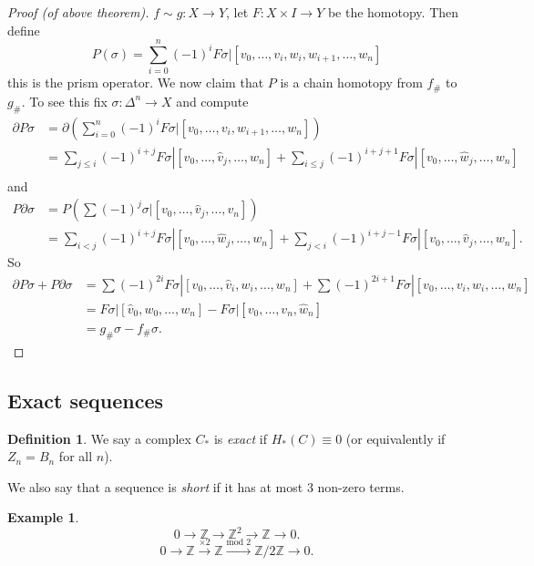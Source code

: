\documentclass[12pt]{article}
\theoremstyle{definition}
\theoremstyle{definition}
\newtheorem*{defn}{Definition}
\newtheorem*{ex}{Example}
\newcommand{\ZZ}{\mathbb{Z}}
\newcommand{\C}{C_*}
\renewcommand{\H}{H_*}
\begin{document}
\begin{proof}[Proof (of above theorem)]
$f\sim g\colon X \to Y$, let $F\colon X \times I \to Y$ be the homotopy.
Then define
\[
P(\sigma) = \sum_{i=0}^{n} (-1)^i F\sigma|[v_0,\ldots,v_{i},w_i,w_{i+1},\ldots,w_n]
\]
this is the prism operator.
We now claim that $P$ is a chain homotopy from $f_\#$ to $g_\#$.
To see this fix $\sigma\colon\Delta^n\to X$ and compute
\begin{align*}
\partial P\sigma
&= \partial\left(\sum_{i=0}^{n} (-1)^i F\sigma|[v_0,\ldots,v_{i},w_{i+1},\ldots,w_n]\right)\\
&= \sum_{j \le i} (-1)^{i+j} F\sigma|[v_0,\ldots,\hat{v}_{j},\ldots,w_n] + \sum_{i \le j} (-1)^{i+j+1} F\sigma|[v_0,\ldots,\hat{w}_{j},\ldots,w_n]\\
\end{align*}
and
\begin{align*}
P\partial \sigma 
&= P\left(\sum (-1)^j \sigma|[v_0,\ldots,\hat{v}_j,\ldots,v_n]\right)\\
&= \sum_{i<j} (-1)^{i+j} F\sigma|[v_0,\ldots,\hat{w}_j,\ldots,w_n] + \sum_{j<i} (-1)^{i+j-1} F\sigma|[v_0,\ldots,\hat{v}_j,\ldots,w_n].
\end{align*}
So 
\begin{align*}
\partial P \sigma + P \partial \sigma &= \sum (-1)^{2i} F\sigma |[v_0,\ldots,\hat v_i,w_i,\ldots,w_n] + \sum (-1)^{2i+1} F\sigma |[v_0,\ldots,v_i,\hat w_i,\ldots,w_n]\\
&= F\sigma |[\hat v_0,w_0,\ldots,w_n] - F\sigma | [v_0,\ldots,v_n,\hat w_n] \\
&= g_\# \sigma -  f_\# \sigma.
\end{align*}
\end{proof}

\subsection{Exact sequences}
\begin{defn}
We say a complex $\C$ is \emph{exact} if $\H(C) \equiv 0$ (or equivalently if $Z_n = B_n$ for all $n$).

We also say that a sequence is \emph{short} if it has at most 3 non-zero terms.
\end{defn}

\begin{ex}
\[
0 \to \ZZ \to \ZZ^2 \to \ZZ \to 0.
\]
\[
0 \to \ZZ \xrightarrow{\times 2} \ZZ \xrightarrow{\text{mod }2} \ZZ/2\ZZ \to 0.
\]
\end{ex}
\end{document}
